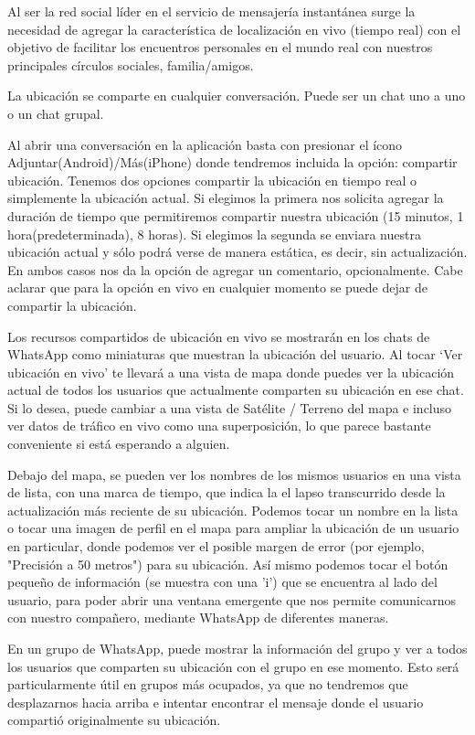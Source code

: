 Al ser la red social líder en el servicio de mensajería instantánea surge la necesidad de agregar la característica de localización en vivo (tiempo real) con el objetivo de facilitar los encuentros personales en el mundo real con nuestros principales círculos sociales, familia/amigos.

La ubicación se comparte en cualquier conversación. Puede ser un chat uno a uno o un chat grupal.

Al abrir una conversación en la aplicación basta con presionar el ícono Adjuntar(Android)/Más(iPhone) donde tendremos incluida la opción: compartir ubicación. Tenemos dos opciones compartir la ubicación en tiempo real o simplemente la ubicación actual. Si elegimos la primera nos solicita agregar la duración de tiempo que permitiremos compartir nuestra ubicación (15 minutos, 1 hora(predeterminada), 8 horas). Si elegimos la segunda se enviara nuestra ubicación actual y sólo podrá verse de manera estática, es decir, sin actualización. En ambos casos nos da la opción de agregar un comentario, opcionalmente. Cabe aclarar que para la opción en vivo en cualquier momento se puede dejar de compartir la ubicación.

Los recursos compartidos de ubicación en vivo se mostrarán en los chats de WhatsApp como miniaturas que muestran la ubicación del usuario. Al tocar ‘Ver ubicación en vivo’ te llevará a una vista de mapa donde puedes ver la ubicación actual de todos los usuarios que actualmente comparten su ubicación en ese chat. Si lo desea, puede cambiar a una vista de Satélite / Terreno del mapa e incluso ver datos de tráfico en vivo como una superposición, lo que parece bastante conveniente si está esperando a alguien.

Debajo del mapa, se pueden ver los nombres de los mismos usuarios en una vista de lista, con una marca de tiempo, que indica la el lapso transcurrido desde la actualización más reciente de su ubicación. Podemos tocar un nombre en la lista o tocar una imagen de perfil en el mapa para ampliar la ubicación de un usuario en particular, donde podemos ver el posible margen de error (por ejemplo, "Precisión a 50 metros") para su ubicación. Así mismo podemos tocar el botón pequeño de información (se muestra con una 'i') que se encuentra al lado del usuario, para poder abrir una ventana emergente que nos permite comunicarnos con nuestro compañero, mediante WhatsApp de diferentes maneras.

En un grupo de WhatsApp, puede mostrar la información del grupo y ver a todos los usuarios que comparten su ubicación con el grupo en ese momento. Esto será particularmente útil en grupos más ocupados, ya que no tendremos que desplazarnos hacia arriba e intentar encontrar el mensaje donde el usuario compartió originalmente su ubicación.

